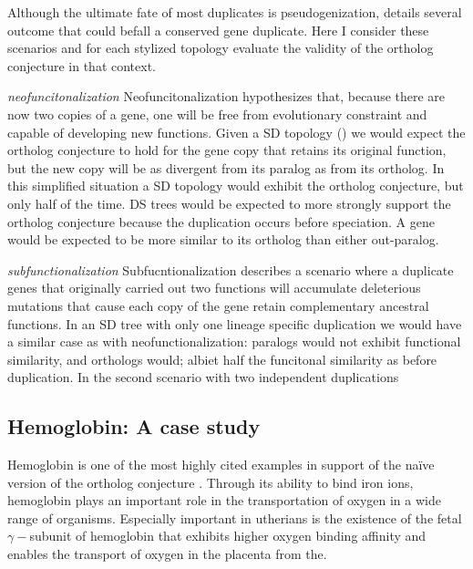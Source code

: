 Although the ultimate fate of most duplicates is pseudogenization, \citet{po} details several outcome that could befall a conserved gene duplicate.  Here I consider these scenarios and for each stylized topology evaluate the validity of the ortholog conjecture in that context.

\emph{neofuncitonalization}  Neofuncitonalization hypothesizes that, because there are now two copies of a gene, one will be free from evolutionary constraint and capable of developing new functions.  Given a SD topology (\Cref{}) we would expect the ortholog conjecture to hold for the gene copy that retains its original function, but the new copy will be as divergent from its paralog as from its ortholog. In this simplified situation a SD topology would exhibit the ortholog conjecture, but only half of the time.  DS trees would be expected to more strongly support the ortholog conjecture because the duplication occurs before speciation.  A gene would be expected to be more similar to its ortholog than either out-paralog.  

\emph{subfunctionalization}  Subfucntionalization describes a scenario where a duplicate genes that originally carried out two functions will accumulate deleterious mutations that cause each copy of the gene retain complementary ancestral functions.  In an SD tree with only one lineage specific duplication we would have a similar case as with neofunctionalization: paralogs would not exhibit functional similarity, and orthologs would; albiet half the funcitonal similarity as before duplication.  In the second scenario with two independent duplications 




\subsection{Hemoglobin: A case study}

Hemoglobin is one of the most highly cited examples in support of the na\"ive version of the ortholog conjecture \citep{Fitch1970}.  Through its ability to bind iron ions, hemoglobin plays an important role in the transportation of oxygen in a wide range of organisms.  Especially important in utherians is the existence of the fetal $\gamma -$subunit of hemoglobin that exhibits higher oxygen binding affinity and enables the transport of oxygen in the placenta from the.  